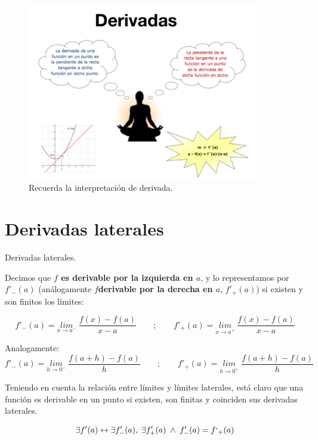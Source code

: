 	
	 \begin{figure}[H]
			\centering
			\includegraphics[width=0.9\textwidth]{imagenes/imagenes04/T04IM07.png}
			\caption {Recuerda la interpretación de derivada.}
			\label{img:mantra-derivada}
	\end{figure}
	
	
	
	\section{Derivadas laterales}
	
	\begin{defi} Derivadas laterales.
	
	Decimos que \textbf{$f$ es derivable por la izquierda en $a$}, y lo representamos por $f'_{-}(a)$ (análogamente \textbf{ $f$derivable por la derecha en $a$}, $f'_{+}(a)$) si existen y son finitos los límites:
	
		\begin{equation}
		\label{ref:derivada-lateral}
			f'_{-}(a)=\underset{x\to a^-}{lim}\;{\dfrac {f(x)-f(a)}{x-a}} \qquad ; \qquad f'_{+}(a)=\underset{x\to a^+}{lim}\;{\dfrac {f(x)-f(a)}{x-a}}
		\end{equation}
		
		Analogamente:
		\begin{equation}
			f'_{-}(a)=\underset{h\to 0^-}{lim}\;{\dfrac {f(a+h)-f(a)}{h}} \qquad ; \qquad f'_{+}(a)=\underset{h\to 0^+}{lim}\;{\dfrac {f(a+h)-f(a)}{h}}
		\end{equation}
		
		
		Teniendo en cuenta la relación entre límites y límites laterales, está claro que una función es derivable en un punto si existen, son finitas y coinciden sus derivadas laterales.
		
		\begin{equation}
			\exists f'(a) \leftrightarrow \exists f'_-(a), \; \exists f'_+(a) \; \wedge \; f'_-(a)=f`_+(a)
		\end{equation}
		
	\end{defi}
	

